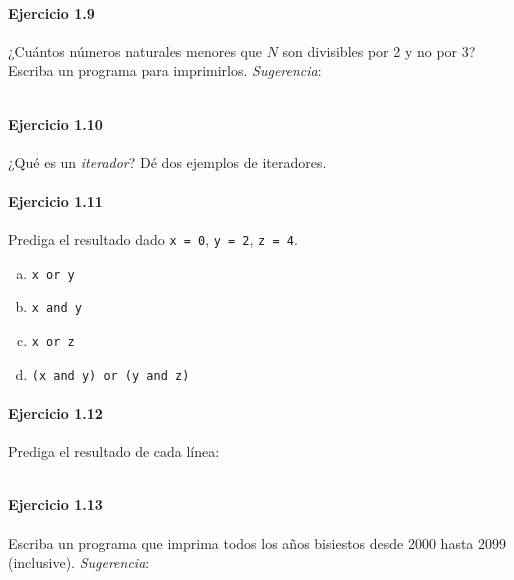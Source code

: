\paragraph{\color{DarkBlue}Ejercicio 1.9}
¿Cuántos números naturales menores que $N$ son divisibles por 2 y no
por 3?
Escriba un programa para imprimirlos.
\emph{Sugerencia}:
\begin{listing}[ht!]
	\inputminted{python}{1.9.py}
\end{listing}

\paragraph{\color{DarkBlue}Ejercicio 1.10}
¿Qué es un \emph{iterador}?
Dé dos ejemplos de iteradores.

\paragraph{\color{DarkBlue}Ejercicio 1.11}
Prediga el resultado dado \texttt{x = 0},
\texttt{y = 2}, \texttt{z = 4}.

\begin{multicols}{2}
	\begin{enumerate}[(a)]
		\item

		      \texttt{x or y}

		\item

		      \texttt{x and y}

		\item

		      \texttt{x or z}

		\item

		      \texttt{(x and y) or (y and z)}
	\end{enumerate}
\end{multicols}

\paragraph{\color{DarkBlue}Ejercicio 1.12}
Prediga el resultado de cada línea:
\begin{listing}[ht!]
	\inputminted{python}{1.12.py}
\end{listing}

\paragraph{\color{DarkBlue}Ejercicio 1.13}
Escriba un programa que imprima todos los años bisiestos desde 2000
hasta 2099 (inclusive).
\emph{Sugerencia}:
\begin{listing}[ht!]
	\inputminted{python}{1.13.py}
\end{listing}

